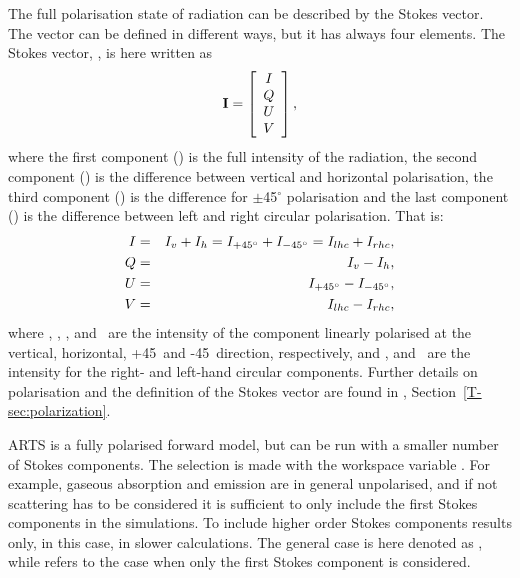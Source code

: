 The full polarisation state of radiation can be described by the Stokes
vector. The vector can be defined in different ways, but it has always
four elements. The Stokes vector, \StoVec, is here written as
\begin{equation}
  \label{eq:fm_defs:stokevec}
  {\bf I} = \left[
  \begin{array}{c}
   I\\ Q \\ U\\ V
  \end{array}
  \right],
\end{equation}
where the first component (\StoI) is the full intensity of the
radiation, the second component (\StoQ) is the difference between
vertical and horizontal polarisation, the third component (\StoU) is the
difference for $\pm$45$^\circ$ polarisation and the last component
(\StoV) is the difference between left and right circular polarisation.
That is:
\begin{eqnarray}
  I &=&   I_v + I_h = I_{+45^\circ} + I_{-45^\circ} = I_{lhc} + I_{rhc}, \\
  Q &=&   I_v - I_h,                                 \\
  U &=&   I_{+45^\circ} - I_{-45^\circ},                             \\
  V &=&   I_{lhc} - I_{rhc},                             
\end{eqnarray}
where \Iv, \Ih, \Ipff, and \Imff\ are the intensity of the component linearly
polarised at the vertical, horizontal, +45\degree\ and -45\degree\ direction,
respectively, and \Irhc, and \Ilhc\ are the intensity for the right- and
left-hand circular components. Further details on polarisation and the
definition of the Stokes vector are found in \theory,
Section~\ref{T-sec:polarization}.

ARTS is a fully polarised forward model, but can be run with a smaller
number of Stokes components. The selection is made with the workspace
variable . For example, gaseous absorption and
emission are in general unpolarised, and if not scattering has to be
considered it is sufficient to only include the first Stokes
components in the simulations. To include higher order Stokes
components results only, in this case, in slower calculations. The
general case is here denoted as ,
while  refers to the case when
only the first Stokes component is considered.
 



